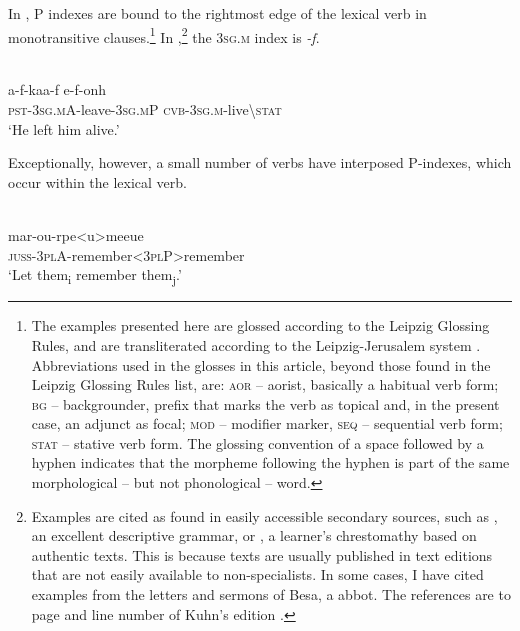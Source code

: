 \documentclass[output=paper]{LSP/langsci}
\begin{document}
In , P indexes are bound to the rightmost edge of the lexical verb in monotransitive clauses.\footnote{The examples presented here are glossed according to the Leipzig Glossing Rules, and are transliterated according to the Leipzig-Jerusalem system \citep{Grossmanetal2015Leipzig-Jerusalem}. Abbreviations used in the glosses in this article, beyond those found in the Leipzig Glossing Rules list, are: \textsc{aor} – aorist, basically a habitual verb form; \textsc{bg} – backgrounder, prefix that marks the verb as topical and, in the present case, an adjunct as focal; \textsc{mod} – modifier marker, \textsc{seq} – sequential verb form; \textsc{stat} – stative verb form. The glossing convention of a space followed by a hyphen indicates that the morpheme following the hyphen is part of the same morphological – but not phonological – word.} In ,\footnote{Examples are cited as found in easily accessible secondary sources, such as \citet{Layton2004Coptic}, an excellent descriptive grammar, or \citet{Shisha-Halevy1988Coptic}, a learner’s chrestomathy based on authentic  texts. This is because  texts are usually published in text editions that are not easily available to non-specialists. In some cases, I have cited examples from the letters and sermons of Besa, a  abbot. The references are to page and line number of Kuhn’s edition \citep{Kuhn1956Letters}.} the \textsc{3sg.m} index is \textit{-f}. 


\begin{exe}
\ex%
\label{05-gr-ex:1}
\\
\gll a-f-kaa-f e-f-onh\\
\textsc{pst}-\textsc{3sg.m}A-leave-\textsc{3sg.m}P \textsc{cvb}-\textsc{3sg.m}-live{\textbackslash}\textsc{stat}\\
\glt ‘He left him alive.’ 
\end{exe}

Exceptionally, however, a small number of verbs have interposed P-indexes, which occur within the lexical verb.

\begin{exe}
\ex%
\label{05-gr-ex:2}
\\
\gll mar-ou-rpe<u>meeue\\
\textsc{juss}-\textsc{3pl}A-remember<\textsc{3pl}P>remember\\
\glt ‘Let them\textsubscript{i} remember them\textsubscript{j}.’  %
\end{exe}
\end{document}
